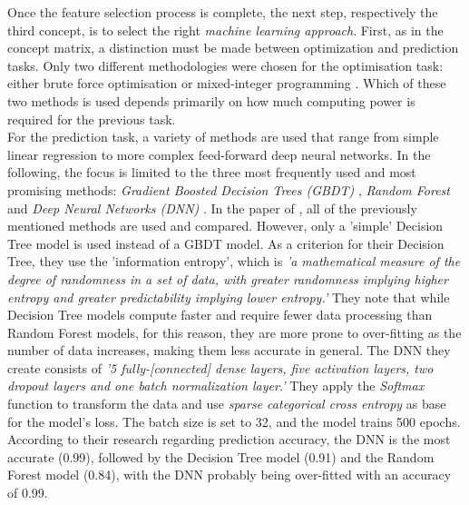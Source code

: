 Once the feature selection process is complete, the next step, respectively the third concept, is to select the right \emph{machine learning approach}. First, as in the concept matrix, a distinction must be made between optimization and prediction tasks. Only two different methodologies were chosen for the optimisation task: either brute force optimisation \parencite{landers_machine_2017} or mixed-integer programming \parencite{becker_analytical_2016,edwards_analyzing_2018, belien_optimization_2017,bonomo_mathematical_2014,matthews_competing_2012}. Which of these two methods is used depends primarily on how much computing power is required for the previous task. \\
\indent For the prediction task, a variety of methods are used that range from simple linear regression to more complex feed-forward deep neural networks. In the following, the focus is limited to the three most frequently used and most promising methods:  \emph{Gradient Boosted Decision Trees (GBDT)} \parencite{landers_machine_2017,deng_analysis_2020}, \emph{Random Forest} \parencite{deng_analysis_2020,shah_poisson_2021,demediuk_performance_2021,bhateja_analysis_2021} and \emph{Deep Neural Networks (DNN)} \parencite{bhateja_analysis_2021,skinner_method_2015,deng_analysis_2020,lutz_fantasy_2015,landers_machine_2017}. In the paper of \citet{deng_analysis_2020}, all of the previously mentioned methods are used and compared. However, only a 'simple' Decision Tree model is used instead of a GBDT model. As a criterion for their Decision Tree, they use the 'information entropy', which is \emph{'a mathematical measure of the degree of randomness in a set of data, with greater randomness implying higher entropy and greater predictability implying lower entropy.'} \parencite[, p. 4]{deng_analysis_2020} They note that while Decision Tree models compute faster and require fewer data processing than Random Forest models, for this reason, they are more prone to over-fitting as the number of data increases, making them less accurate in general. The DNN they create consists of \emph{'5 fully-[connected] dense layers, five activation layers, two dropout layers and one batch normalization layer.'} \parencite[, p. 4]{deng_analysis_2020} They apply the \emph{Softmax} function to transform the data and use \emph{sparse categorical cross entropy} as base for the model's loss. The batch size is set to 32, and the model trains 500 epochs. According to their research regarding prediction accuracy, the DNN is the most accurate (0.99), followed by the Decision Tree model (0.91) and the Random Forest model (0.84), with the DNN probably being over-fitted with an accuracy of 0.99. \\
